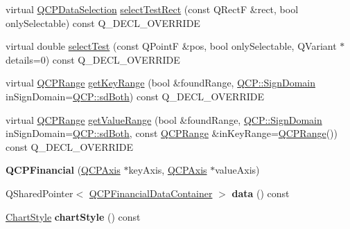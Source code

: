 \begin{DoxyCompactItemize}
\item 
virtual \hyperlink{class_q_c_p_data_selection}{Q\+C\+P\+Data\+Selection} \hyperlink{class_q_c_p_financial_a3c5beb1ab028a1dba845fc9dcffc7cf4}{select\+Test\+Rect} (const Q\+RectF \&rect, bool only\+Selectable) const Q\+\_\+\+D\+E\+C\+L\+\_\+\+O\+V\+E\+R\+R\+I\+DE
\item 
virtual double \hyperlink{class_q_c_p_financial_aac8e91622ac58330fa9ce81cc8fd40ee}{select\+Test} (const Q\+PointF \&pos, bool only\+Selectable, Q\+Variant $\ast$details=0) const Q\+\_\+\+D\+E\+C\+L\+\_\+\+O\+V\+E\+R\+R\+I\+DE
\item 
virtual \hyperlink{class_q_c_p_range}{Q\+C\+P\+Range} \hyperlink{class_q_c_p_financial_a15d68fb257113fef697356d65fa76559}{get\+Key\+Range} (bool \&found\+Range, \hyperlink{namespace_q_c_p_afd50e7cf431af385614987d8553ff8a9}{Q\+C\+P\+::\+Sign\+Domain} in\+Sign\+Domain=\hyperlink{namespace_q_c_p_afd50e7cf431af385614987d8553ff8a9a3dee7e9cd2fedce9253b83e172626a6c}{Q\+C\+P\+::sd\+Both}) const Q\+\_\+\+D\+E\+C\+L\+\_\+\+O\+V\+E\+R\+R\+I\+DE
\item 
virtual \hyperlink{class_q_c_p_range}{Q\+C\+P\+Range} \hyperlink{class_q_c_p_financial_a82d862aa134d78853f98f8c57a03415b}{get\+Value\+Range} (bool \&found\+Range, \hyperlink{namespace_q_c_p_afd50e7cf431af385614987d8553ff8a9}{Q\+C\+P\+::\+Sign\+Domain} in\+Sign\+Domain=\hyperlink{namespace_q_c_p_afd50e7cf431af385614987d8553ff8a9a3dee7e9cd2fedce9253b83e172626a6c}{Q\+C\+P\+::sd\+Both}, const \hyperlink{class_q_c_p_range}{Q\+C\+P\+Range} \&in\+Key\+Range=\hyperlink{class_q_c_p_range}{Q\+C\+P\+Range}()) const Q\+\_\+\+D\+E\+C\+L\+\_\+\+O\+V\+E\+R\+R\+I\+DE
\item 
\mbox{\label{class_q_c_p_financial_a4702d5248feeb9d1ec6e3ce725b10b32}} 
{\bfseries Q\+C\+P\+Financial} (\hyperlink{class_q_c_p_axis}{Q\+C\+P\+Axis} $\ast$key\+Axis, \hyperlink{class_q_c_p_axis}{Q\+C\+P\+Axis} $\ast$value\+Axis)
\item 
\mbox{\label{class_q_c_p_financial_a4d95fc450c7c7d2202eb65d49f87c05a}} 
Q\+Shared\+Pointer$<$ \hyperlink{class_q_c_p_data_container}{Q\+C\+P\+Financial\+Data\+Container} $>$ {\bfseries data} () const
\item 
\mbox{\label{class_q_c_p_financial_a5243371c1fde30fdae00555d7760ec2d}} 
\hyperlink{class_q_c_p_financial_a0f800e21ee98d646dfc6f8f89d10ebfb}{Chart\+Style} {\bfseries chart\+Style} () const

\end{DoxyCompactItemize}

